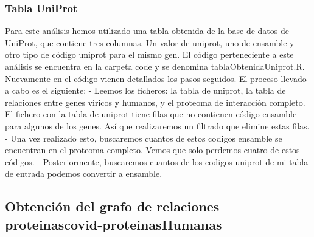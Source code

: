 \subsubsection{Tabla UniProt}
Para este análisis hemos utilizado una tabla obtenida de la base de datos de UniProt, que contiene tres columnas. Un valor de uniprot, uno de ensamble y otro tipo de código uniprot para el mismo gen. 
El código perteneciente a este análisis se encuentra en la carpeta code y se denomina tablaObtenidaUniprot.R. Nuevamente en el código vienen detallados los pasos seguidos. 
El proceso llevado a cabo es el siguiente:
- Leemos los ficheros: la tabla de uniprot, la tabla de relaciones entre genes viricos y humanos, y el proteoma de interacción completo. El fichero con la tabla de uniprot tiene filas que no contienen código ensamble para algunos de los genes. Así que realizaremos un filtrado que elimine estas filas.
- Una vez realizado esto, buscaremos cuantos de estos codigos ensamble se encuentran en el proteoma completo. Vemos que solo perdemos cuatro de estos códigos.
- Posteriormente, buscaremos cuantos de los codigos uniprot de mi tabla de entrada podemos convertir a ensamble. 


\subsection{Obtención del grafo de relaciones proteinascovid-proteinasHumanas}

